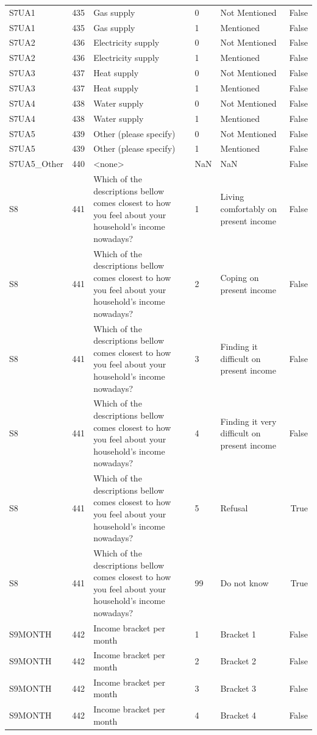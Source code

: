 \begin{tabular}{lrlllr}
S7UA1 & 435 & Gas supply & 0 & Not Mentioned & False \\
S7UA1 & 435 & Gas supply & 1 & Mentioned & False \\
S7UA2 & 436 & Electricity supply & 0 & Not Mentioned & False \\
S7UA2 & 436 & Electricity supply & 1 & Mentioned & False \\
S7UA3 & 437 & Heat supply & 0 & Not Mentioned & False \\
S7UA3 & 437 & Heat supply & 1 & Mentioned & False \\
S7UA4 & 438 & Water supply & 0 & Not Mentioned & False \\
S7UA4 & 438 & Water supply & 1 & Mentioned & False \\
S7UA5 & 439 & Other (please specify) & 0 & Not Mentioned & False \\
S7UA5 & 439 & Other (please specify) & 1 & Mentioned & False \\
S7UA5_Other & 440 & <none> & NaN & NaN & False \\
S8 & 441 & Which of the descriptions bellow comes closest to how you feel about your household’s income nowadays? & 1 & Living comfortably on present income & False \\
S8 & 441 & Which of the descriptions bellow comes closest to how you feel about your household’s income nowadays? & 2 & Coping on present income & False \\
S8 & 441 & Which of the descriptions bellow comes closest to how you feel about your household’s income nowadays? & 3 & Finding it difficult on present income & False \\
S8 & 441 & Which of the descriptions bellow comes closest to how you feel about your household’s income nowadays? & 4 & Finding it very difficult on present income & False \\
S8 & 441 & Which of the descriptions bellow comes closest to how you feel about your household’s income nowadays? & 5 & Refusal & True \\
S8 & 441 & Which of the descriptions bellow comes closest to how you feel about your household’s income nowadays? & 99 & Do not know & True \\
S9MONTH & 442 & Income bracket per month & 1 & Bracket 1 & False \\
S9MONTH & 442 & Income bracket per month & 2 & Bracket 2 & False \\
S9MONTH & 442 & Income bracket per month & 3 & Bracket 3 & False \\
S9MONTH & 442 & Income bracket per month & 4 & Bracket 4 & False \\

\end{tabular}
